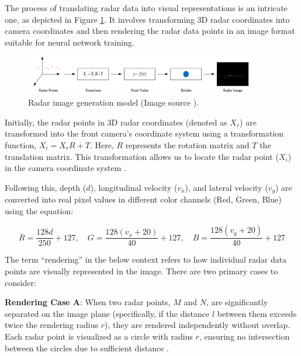 \documentclass[report.tex]{subfiles}
\begin{document}
    The process of translating radar data into visual representations is an intricate one, as depicted in Figure \ref{fig:saffcos_radar_image_generation_process}. It involves transforming 3D radar coordinates into camera coordinates and then rendering the radar data points in an image format suitable for neural network training.

    \begin{figure}[h]
        \centering
        \includegraphics[width=0.9\textwidth]{images/methods/saf_fcos/the_radar_image_generation_process.png}
        \caption{Radar image generation model (Image source \cite{chang2020spatial}).}
        \label{fig:saffcos_radar_image_generation_process}
    \end{figure}

    Initially, the radar points in 3D radar coordinates (denoted as ${X_r}$) are transformed into the front camera's coordinate system using a transformation function, ${X_i = X_r R + T}$. Here, ${R}$ represents the rotation matrix and ${T}$ the translation matrix. This transformation allows us to locate the radar point (${X_i}$) in the camera coordinate system \cite{chang2020spatial}.

    \vspace{\baselineskip}
    \vspace{\baselineskip}
    \vspace{\baselineskip}

    Following this, depth (${d}$), longitudinal velocity (${v_x}$), and lateral velocity (${v_y}$) are converted into real pixel values in different color channels (Red, Green, Blue) using the equation:

    \begin{equation}
        R = \frac{128d}{250} + {127}, \quad G = \frac{128(v_x + 20)}{40} + {127}, \quad B = \frac{128(v_y + 20)}{40} + {127}
    \end{equation}

    The term ``rendering'' in the below context refers to how individual radar data points are visually represented in the image. There are two primary cases to consider:

    \textbf{Rendering Case A}: When two radar points, \( M \) and \( N \), are significantly separated on the image plane (specifically, if the distance \( l \) between them exceeds twice the rendering radius \( r \)), they are rendered independently without overlap. Each radar point is visualized as a circle with radius \( r \), ensuring no intersection between the circles due to sufficient distance \cite{chang2020spatial}.
\end{document}
